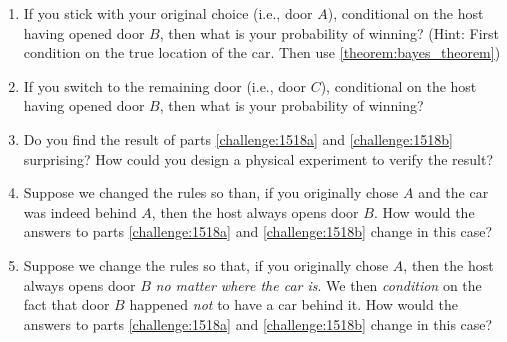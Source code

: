 \begin{challeges}
    \begin{enumerate}
       \item \label{challenge:1518a}If you stick with your original choice (i.e., door $A$), conditional on the host having opened door $B$, then what is your probability of winning? (Hint: First condition on the true location of the car. Then use \autoref{theorem:bayes_theorem})
       \item \label{challenge:1518b}If you switch to the remaining door (i.e., door $C$), conditional on the host having opened door $B$, then what is your probability of winning?
       \item Do you find the result of parts \autoref{challenge:1518a} and \autoref{challenge:1518b} surprising? How could you design a physical experiment to verify the result?
       \item Suppose we changed the rules so than, if you originally chose $A$ and the car was indeed behind $A$, then the host always opens door $B$. How would the answers to parts \autoref{challenge:1518a} and \autoref{challenge:1518b} change in this case?
       \item \label{challenge:1518e}Suppose we change the rules so that, if you originally chose $A$, then the host always opens door $B$ \emph{no matter where the car is}. We then \emph{condition} on the fact that door $B$ happened \emph{not} to have a car behind it. How would the answers to parts \autoref{challenge:1518a} and \autoref{challenge:1518b} change in this case?
   \end{enumerate}
\end{challeges}


